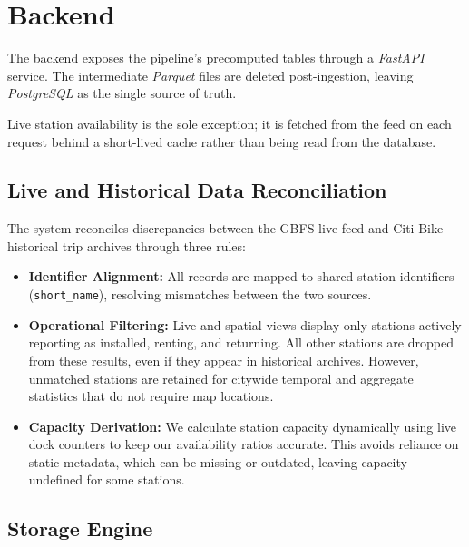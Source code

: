 \section{Backend}\label{sec:backend}
The backend exposes the pipeline's precomputed tables through a \emph{FastAPI} service.
The intermediate \emph{Parquet} files are deleted post-ingestion, leaving \emph{PostgreSQL} as the single source of truth.

Live station availability is the sole exception; it is fetched from the feed on each request behind a short-lived cache rather than being read from the database.

\subsection{Live and Historical Data Reconciliation}

The system reconciles discrepancies between the GBFS live feed and Citi Bike historical trip archives through three rules:
\begin{itemize}
    \item \textbf{Identifier Alignment:} All records are mapped to shared station identifiers (\texttt{short\_name}), resolving mismatches between the two sources.
    \item \textbf{Operational Filtering:} Live and spatial views display only stations actively reporting as installed, renting, and returning.
    All other stations are dropped from these results, even if they appear in historical archives.
    However, unmatched stations are retained for citywide temporal and aggregate statistics that do not require map locations.
    \item \textbf{Capacity Derivation:} We calculate station capacity dynamically using live dock counters to keep our availability ratios accurate.
    This avoids reliance on static metadata, which can be missing or outdated, leaving capacity undefined for some stations.
\end{itemize}

\subsection{Storage Engine}

